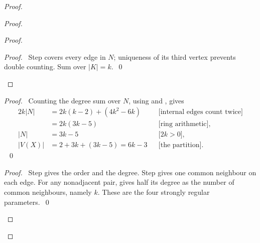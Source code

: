 \begin{proof}
\begin{proof}
\begin{proof}
   \qedstep
   \begin{proof}
    \pf\ Step  covers every edge in $N$; uniqueness of its third
    vertex prevents double counting. Sum  over $|K|=k$.~\qed
   \end{proof}
  \end{proof}
  \begin{proof}
   \pf\ Counting the degree sum over $N$, using  and ,
   gives
   \begin{align*}
    2k|N|&=2k(k-2)+(4k^2-6k)&&\text{[internal edges count twice]}\\
          &=2k(3k-5)&&\text{[ring arithmetic],}\\
    |N|&=3k-5&&\text{[$2k>0$],}\\
    |V(X)|&=2+3k+(3k-5)=6k-3&&\text{[the partition].}
   \end{align*}
   ~\qed
  \end{proof}
  \qedstep
  \begin{proof}
   \pf\ Step  gives the order and  the degree.
   Step  gives one common neighbour on each edge.
   For any nonadjacent pair,  gives half its degree as the number
   of common neighbours, namely $k$. These are the four strongly regular parameters.~\qed
  \end{proof}
 \end{proof}


\end{proof}
